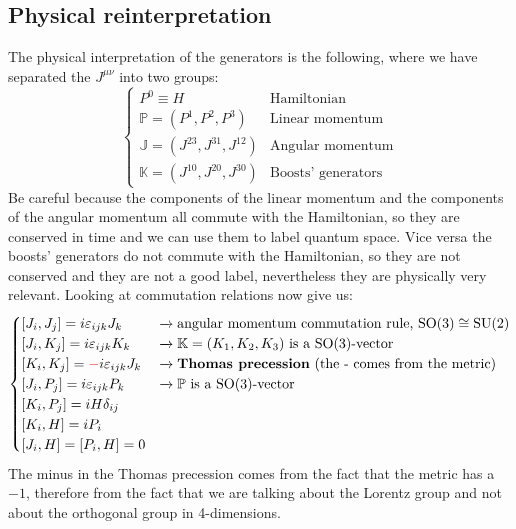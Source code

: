 \documentclass[../main.tex]{subfiles}
\begin{document}
\subsection{Physical reinterpretation}
The physical interpretation of the generators is the following, where we have separated the $J^{\mu\nu}$ into two groups:
\[
\begin{cases}
P^0\equiv H &\textrm{Hamiltonian}\\
\mathbb{P}=(P^1,P^2,P^3) &\textrm{Linear momentum}\\
\mathbb{J}=(J^{23},J^{31},J^{12}) &\textrm{Angular momentum}\\
\mathbb{K}=(J^{10},J^{20},J^{30}) &\textrm{Boosts' generators}
\end{cases}
\]
Be careful because the components of the linear momentum and the components of the angular momentum all commute with the Hamiltonian, so they are conserved in time and we can use them to label quantum space. Vice versa the boosts' generators do not commute with the Hamiltonian, so they are not conserved and they are not a good label, nevertheless they are physically very relevant. Looking at commutation relations now give us:
\[
\begin{cases}
[J_i,J_j]=i\varepsilon_{ijk}J_k &\xrightarrow[]{}\text{angular momentum commutation rule, $\textrm{SO}(3)\cong\textrm{SU}(2)$}\\
[J_i,K_j]=i\varepsilon_{ijk}K_k&\xrightarrow[]{}\mathbb{K}=(K_1,K_2,K_3) \text{ is a SO(3)-vector}\\
[K_i,K_j]={\color{red}-}i\varepsilon_{ijk}J_k&\xrightarrow[]{}\text{\textbf{Thomas precession} (the - comes from the metric)}\\
[J_i,P_j]=i\varepsilon_{ijk}P_k&\xrightarrow[]{}\mathbb{P}\text{ is a SO(3)-vector}\\
[K_i,P_j]=iH\delta_{ij}\\
[K_i,H]=iP_i\\
[J_i,H]=[P_i,H]=0
\end{cases}
\]
The minus in the Thomas precession comes from the fact that the metric has a $-1$, therefore from the fact that we are talking about the Lorentz group and not about the orthogonal group in 4-dimensions.
\end{document}
